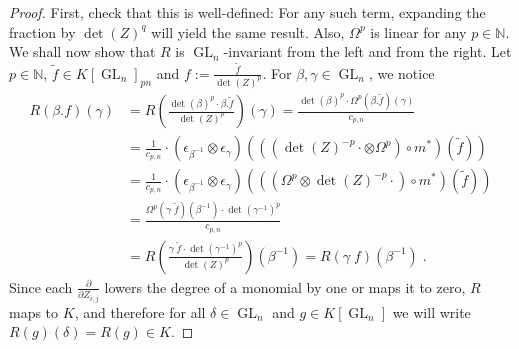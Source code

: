 \begin{proof}
  First, check that this is well-defined:
  For any such term, expanding the fraction by $ \operatorname{det} (Z)^q $ will yield the same result.
  Also, $\Omega^p$ is linear for any $p \in \mathbb{N}$.
  We shall now show that $R$ is $\operatorname{GL}_n$-invariant from the left and from the right.
  Let $p \in \mathbb{N}$, $ \tilde{f} \in K \left\lbrack \operatorname{GL}_n \right\rbrack_{pn} $ and $ f := \frac{\tilde{f}}{\operatorname{det}(Z)^p} $.
  For $ \beta , \gamma \in \operatorname{GL}_n $, we notice
  \begin{equation*}
    \begin{aligned}
      R \left( \beta . f \right) (\gamma)
      &= R \left( \frac{ \operatorname{det} (\beta)^p \cdot \beta . \tilde{f}}{\operatorname{det} (Z)^p} \right) (\gamma)  
      = \frac{ \operatorname{det} (\beta)^p \cdot \Omega^p \left( \beta . \tilde{f} \right) (\gamma) }{ c_{p,n} } \\
      &= \frac{1}{c_{p,n}} \cdot \left( \epsilon_{\beta^{-1}} \otimes \epsilon_\gamma \right) \left( \left( \left( \operatorname{det}(Z)^{-p} \cdot \otimes \Omega^p \right) \circ m^\ast \right) ( \tilde{f} ) \right) \\
      &= \frac{1}{c_{p,n}} \cdot \left( \epsilon_{\beta^{-1}} \otimes \epsilon_\gamma \right) \left( \left( \left( \Omega^p \otimes \operatorname{det}(Z)^{-p} \cdot \right) \circ m^\ast \right) ( \tilde{f} ) \right) \\
      &= \frac{ \Omega^p \left( \gamma \dot{\phantom{.}} \tilde{f} \right) (\beta^{-1}) \cdot \operatorname{det} \left (\gamma^{-1} \right)^p }{ c_{p,n} }  \\
      &= R \left( \frac{ \gamma \dot{\phantom{.}} \tilde{f} \cdot \operatorname{det} \left( \gamma^{-1} \right)^p }{\operatorname{det} (Z)^p} \right) \left( \beta^{-1} \right)  
      = R \left( \gamma \dot{\phantom{.}} f \right) \left( \beta^{-1} \right) \; .
    \end{aligned}
  \end{equation*}
  Since each $ \frac {\partial}{ \partial Z_{i,j} } $ lowers the degree of a monomial by one or maps it to zero, $R$ maps to $K$, and therefore for all $ \delta \in \operatorname{GL}_n $ and $ g \in K \left\lbrack \operatorname{GL}_n \right\rbrack $ we will write \linebreak$ R(g)(\delta) = R(g) \in K $.

\end{proof}
